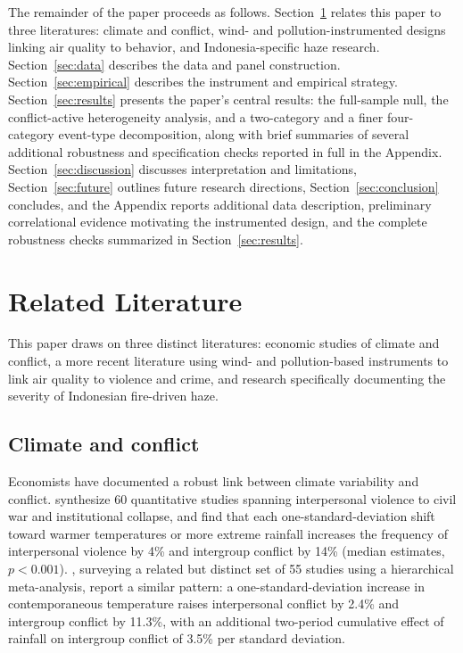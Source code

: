 \documentclass[12pt]{article}
\begin{document}
The remainder of the paper proceeds as follows. Section~\ref{sec:litreview} relates this paper to three literatures: climate and conflict, wind- and pollution-instrumented designs linking air quality to behavior, and Indonesia-specific haze research. Section~\ref{sec:data} describes the data and panel construction. Section~\ref{sec:empirical} describes the instrument and empirical strategy. Section~\ref{sec:results} presents the paper's central results: the full-sample null, the conflict-active heterogeneity analysis, and a two-category and a finer four-category event-type decomposition, along with brief summaries of several additional robustness and specification checks reported in full in the Appendix. Section~\ref{sec:discussion} discusses interpretation and limitations, Section~\ref{sec:future} outlines future research directions, Section~\ref{sec:conclusion} concludes, and the Appendix reports additional data description, preliminary correlational evidence motivating the instrumented design, and the complete robustness checks summarized in Section~\ref{sec:results}.

\section{Related Literature}
\label{sec:litreview}

This paper draws on three distinct literatures: economic studies of climate and conflict, a more recent literature using wind- and pollution-based instruments to link air quality to violence and crime, and research specifically documenting the severity of Indonesian fire-driven haze.

\subsection{Climate and conflict}

Economists have documented a robust link between climate variability and conflict. \citet{hsiang2013quantifying} synthesize 60 quantitative studies spanning interpersonal violence to civil war and institutional collapse, and find that each one-standard-deviation shift toward warmer temperatures or more extreme rainfall increases the frequency of interpersonal violence by 4\% and intergroup conflict by 14\% (median estimates, $p<0.001$). \citet{burkehsiangmiguel2015}, surveying a related but distinct set of 55 studies using a hierarchical meta-analysis, report a similar pattern: a one-standard-deviation increase in contemporaneous temperature raises interpersonal conflict by 2.4\% and intergroup conflict by 11.3\%, with an additional two-period cumulative effect of rainfall on intergroup conflict of 3.5\% per standard deviation.
\end{document}

